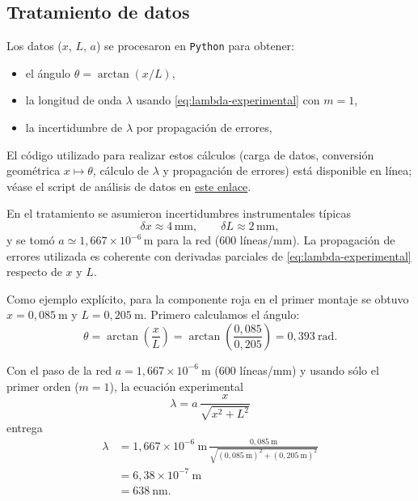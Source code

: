 \documentclass[11pt,twocolumn]{article}
\begin{document}
\subsection{Tratamiento de datos}
Los datos ($x$, $L$, $a$) se procesaron en \texttt{Python} para obtener:
\begin{itemize}
    \item el ángulo $\theta = \arctan(x/L)$,
    \item la longitud de onda $\lambda$ usando \eqref{eq:lambda-experimental} con $m=1$,
    \item la incertidumbre de $\lambda$ por propagación de errores,
\end{itemize}

El código utilizado para realizar estos cálculos (carga de datos, conversión geométrica $x \mapsto \theta$, cálculo de $\lambda$ y propagación de errores) está disponible en línea; véase el script de análisis de datos en \href{https://udeconce-my.sharepoint.com/my?viewid=d66ef332%2Dcdd4%2D4011%2D840a%2D91d8ea92db3d&id=%2Fpersonal%2Fjrosas2022%5Fudec%5Fcl%2FDocuments%2FDatos%20adjuntos%2Flab%5Fcuantica%5F1%2Epy&parent=%2Fpersonal%2Fjrosas2022%5Fudec%5Fcl%2FDocuments%2FDatos%20adjuntos}{este enlace}.

En el tratamiento se asumieron incertidumbres instrumentales típicas
\[
    \delta x \approx 4\,\text{mm}, 
    \qquad
    \delta L \approx 2\,\text{mm},
\]
y se tomó $a \simeq 1{,}667\times10^{-6}\,\text{m}$ para la red (600 líneas/mm). La propagación de errores utilizada es coherente con derivadas parciales de \eqref{eq:lambda-experimental} respecto de $x$ y $L$.

Como ejemplo explícito, para la componente roja en el primer montaje se obtuvo
$x = 0{,}085\ \text{m}$ y $L = 0{,}205\ \text{m}$.
Primero calculamos el ángulo:
\[
\theta = \arctan\!\left(\frac{x}{L}\right)
= \arctan\!\left(\frac{0{,}085}{0{,}205}\right)
= 0{,}393\ \text{rad}.
\]

Con el paso de la red $a = 1{,}667\times10^{-6}\ \text{m}$ (600 líneas/mm) y usando sólo el primer orden ($m=1$), la ecuación experimental
\[
\lambda = a\,\frac{x}{\sqrt{x^{2}+L^{2}}}
\]
entrega
\begin{align*}
    \lambda
&= 1{,}667\times10^{-6}\ \text{m}\,
\frac{0{,}085\ \text{m}}{\sqrt{(0{,}085\ \text{m})^{2} + (0{,}205\ \text{m})^{2}}}\\
&= 6{,}38\times10^{-7}\ \text{m}\\
&= 638\ \text{nm}.
\end{align*}
\end{document}
